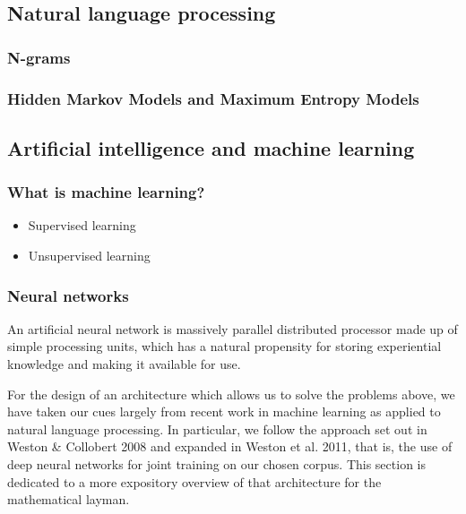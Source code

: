 \subsection{Natural language processing}
\label{sec:nlp}

\subsubsection{N-grams}
\label{sec:ngrams}

\subsubsection{Hidden Markov Models and Maximum Entropy Models}
\label{sec:hmm-maxent}

\subsection{Artificial intelligence and machine learning}
\label{sec:aiml}

\subsubsection{What is machine learning?}
\label{sec:statistics}
\begin{itemize}
  \item Supervised learning
  \item Unsupervised learning
\end{itemize}

\subsubsection{Neural networks}
\label{sec:neuralnetworks}

An artificial neural network is massively parallel distributed
processor made up of simple processing units, which has a natural
propensity for storing experiential knowledge and making it available
for use.

For the design of an architecture which allows us to solve the
problems above, we have taken our cues largely from recent work in
machine learning as applied to natural language processing. In
particular, we follow the approach set out in Weston \& Collobert 2008
and expanded in Weston et al. 2011, that is, the use of deep neural
networks for joint training on our chosen corpus. This section is
dedicated to a more expository overview of that architecture for the
mathematical layman.

